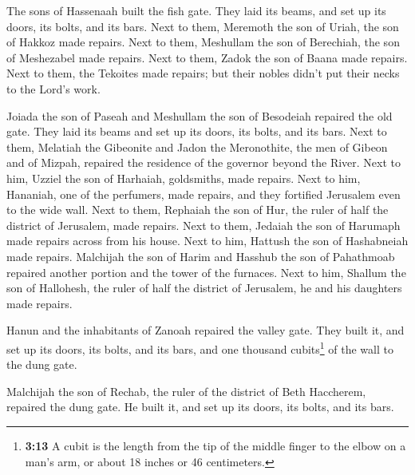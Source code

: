  The sons of Hassenaah built the fish gate. They laid its
beams, and set up its doors, its bolts, and its bars. 
Next to them, Meremoth the son of Uriah, the son of Hakkoz made repairs.
Next to them, Meshullam the son of Berechiah, the son of Meshezabel made
repairs. Next to them, Zadok the son of Baana made repairs.
 Next to them, the Tekoites made repairs; but their nobles
didn't put their necks to the Lord's work.

 Joiada the son of Paseah and Meshullam the son of
Besodeiah repaired the old gate. They laid its beams and set up its
doors, its bolts, and its bars.  Next to them, Melatiah
the Gibeonite and Jadon the Meronothite, the men of Gibeon and of
Mizpah, repaired the residence of the governor beyond the River.
 Next to him, Uzziel the son of Harhaiah, goldsmiths, made
repairs. Next to him, Hananiah, one of the perfumers, made repairs, and
they fortified Jerusalem even to the wide wall.  Next to
them, Rephaiah the son of Hur, the ruler of half the district of
Jerusalem, made repairs.  Next to them, Jedaiah the son
of Harumaph made repairs across from his house. Next to him, Hattush the
son of Hashabneiah made repairs.  Malchijah the son of
Harim and Hasshub the son of Pahathmoab repaired another portion and the
tower of the furnaces.  Next to him, Shallum the son of
Hallohesh, the ruler of half the district of Jerusalem, he and his
daughters made repairs.

 Hanun and the inhabitants of Zanoah repaired the valley
gate. They built it, and set up its doors, its bolts, and its bars, and
one thousand cubits\footnote{\textbf{3:13} A cubit is the length from
  the tip of the middle finger to the elbow on a man's arm, or about 18
  inches or 46 centimeters.} of the wall to the dung gate.

 Malchijah the son of Rechab, the ruler of the district
of Beth Haccherem, repaired the dung gate. He built it, and set up its
doors, its bolts, and its bars.

